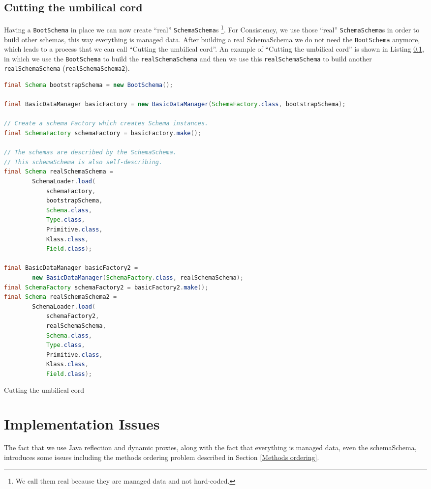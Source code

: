 \subsection{Cutting the umbilical cord}\label{subsec:Cutting the umbilical cord}
Having a \texttt{BootSchema} in place we can now create ``real'' \texttt{SchemaSchema}s \footnote{
	We call them real because they are managed data and not hard-coded.}.
For Consistency, we use those ``real'' \texttt{SchemaSchema}s in order to build other schemas, this way everything is managed data.
After building a real SchemaSchema we do not need the \texttt{BootSchema} anymore, which leads to a process that we can call ``Cutting the umbilical cord''.
An example of ``Cutting the umbilical cord'' is shown in Listing \ref{subsec:Cutting the umbilical cord}, in which we use the \texttt{BootSchema} to build the \texttt{realSchemaSchema} and then we use this \texttt{realSchemaSchema} to build another \texttt{realSchemaSchema} (\texttt{realSchemaSchema2}).

\begin{sourcecode} [H]
	\begin{lstlisting}[language=Java, escapechar=|]
final Schema bootstrapSchema = new BootSchema();

final BasicDataManager basicFactory = new BasicDataManager(SchemaFactory.class, bootstrapSchema);

// Create a schema Factory which creates Schema instances.
final SchemaFactory schemaFactory = basicFactory.make();

// The schemas are described by the SchemaSchema.
// This schemaSchema is also self-describing.
final Schema realSchemaSchema =
        SchemaLoader.load(
        	schemaFactory, 
        	bootstrapSchema, 
        	Schema.class, 
        	Type.class, 
        	Primitive.class, 
        	Klass.class, 
        	Field.class);

final BasicDataManager basicFactory2 = 
		new BasicDataManager(SchemaFactory.class, realSchemaSchema);
final SchemaFactory schemaFactory2 = basicFactory2.make();
final Schema realSchemaSchema2 =
        SchemaLoader.load(
        	schemaFactory2, 
        	realSchemaSchema, 
        	Schema.class, 
        	Type.class, 
        	Primitive.class, 
        	Klass.class, 
        	Field.class);
	\end{lstlisting}
	\caption{Cutting the umbilical cord}
	\label{lst:Cutting the umbilical cord}
\end{sourcecode}

\section{Implementation Issues}\label{Implementation Issues}
The fact that we use Java reflection and dynamic proxies, along with the fact that everything is managed data, even the schemaSchema, introduces some issues including the methods ordering problem described in Section \ref{Methods ordering}.

